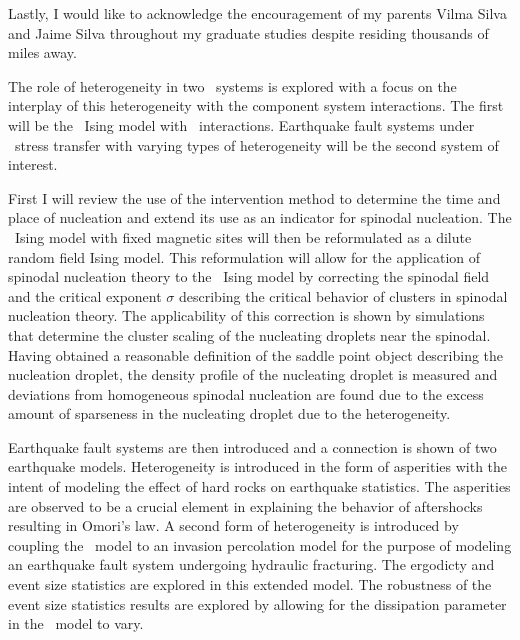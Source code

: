 Lastly, I would like to acknowledge the encouragement of my parents Vilma Silva and Jaime Silva throughout my graduate studies despite residing thousands of miles away. 


\begin{abstractpage}
The role of heterogeneity in two \lr\ systems is explored with a focus on the interplay of this heterogeneity with the component system interactions. The first will be the \het\ Ising model with \lr\ interactions. Earthquake fault systems under \lr\ stress transfer with varying types of heterogeneity will be the second system of interest. 

First I will review the use of the intervention method  to determine the time and place of nucleation and extend its use as an indicator for spinodal nucleation. The \het\ Ising model with fixed magnetic sites will then be reformulated as a dilute random field Ising model. This reformulation will allow for the application of spinodal nucleation theory to the \het\ Ising model by correcting the spinodal field and the critical exponent $\sigma$ describing the critical behavior of clusters in spinodal nucleation theory. The applicability of this correction is shown by simulations that determine the cluster scaling of the nucleating droplets near the spinodal. Having obtained a reasonable definition of the saddle point object describing the nucleation droplet, the density profile of the nucleating droplet is measured and deviations from  homogeneous spinodal nucleation are found due to the excess amount of sparseness in the nucleating droplet due to the heterogeneity.

Earthquake fault systems are then introduced and a connection is shown of two earthquake models. Heterogeneity is introduced in the form of asperities with the intent of modeling the effect of hard rocks  on  earthquake statistics. The asperities are observed to be a crucial element in explaining the behavior of aftershocks resulting in Omori's law. A second form of heterogeneity is introduced by coupling the \ofc\ model to an invasion percolation model for the purpose of modeling an earthquake fault system undergoing hydraulic fracturing. The ergodicty and event size statistics are explored in this extended model. The robustness of the event size statistics results are explored by allowing for the dissipation parameter in the \ofc\ model to vary.

\end{abstractpage}

